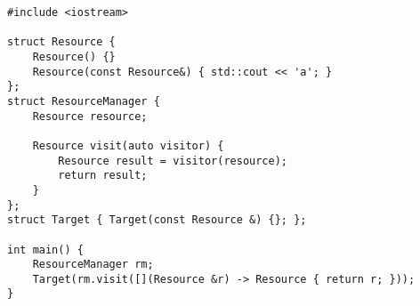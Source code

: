 \begin{lstlisting}[title=\href{https://godbolt.org/z/p3oNMS}{\texttt{godbolt.org/z/p3oNMS}}]
#include <iostream>

struct Resource {
    Resource() {}
    Resource(const Resource&) { std::cout << 'a'; }
};
struct ResourceManager {
    Resource resource;
 
    Resource visit(auto visitor) {
        Resource result = visitor(resource);
        return result;
    }
};
struct Target { Target(const Resource &) {}; };

int main() {
    ResourceManager rm;
    Target(rm.visit([](Resource &r) -> Resource { return r; }));
}
\end{lstlisting}
